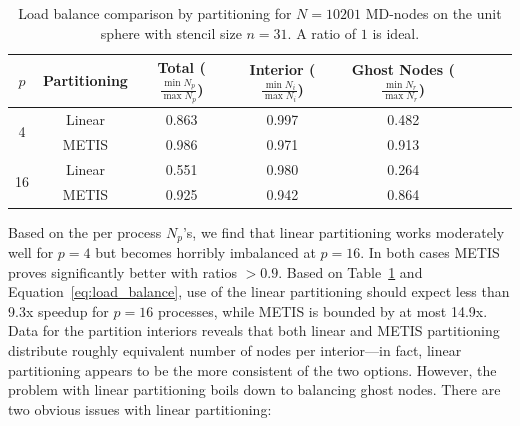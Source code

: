 \documentclass{report}
\begin{document}
\begin{table}
\centering
\caption{Load balance comparison by partitioning for $N=10201$ MD-nodes on the unit sphere with stencil size $n=31$. A ratio of $1$ is ideal.}
\label{tbl:load_balance}
\begin{tabular}{c|c|c|c|c|c|c|c}
$p$ & Partitioning & Total ($\frac{\min N_p}{\max N_p}$) &  Interior ($\frac{\min N_i}{\max N_i}$) & Ghost Nodes ($\frac{\min N_r}{\max N_r}$)  \\ \hline
\multirow{2}{*}{4} & Linear  &  0.863 & 0.997 & 0.482  \\
& METIS  & 0.986 & 0.971 & 0.913   \\ \hline
\multirow{2}{*}{16} & Linear &  0.551 & 0.980 & 0.264   \\
& METIS & 0.925 & 0.942 & 0.864  \\
\end{tabular}
\end{table}
%
Based on the per process $N_p$'s, we find that linear partitioning works moderately well for $p=4$ but becomes horribly imbalanced at $p=16$. In both cases METIS proves significantly better with ratios $> 0.9$. Based on Table~\ref{tbl:load_balance} and Equation~\ref{eq:load_balance}, use of the linear partitioning should expect less than 9.3x speedup for $p=16$ processes, while METIS is bounded by at most 14.9x. Data for the partition interiors reveals that both linear and METIS partitioning distribute roughly equivalent number of nodes per interior---in fact, linear partitioning appears to be the more consistent of the two options. However, the problem with linear partitioning boils down to balancing ghost nodes. There are two obvious issues with linear partitioning:
\end{document}
